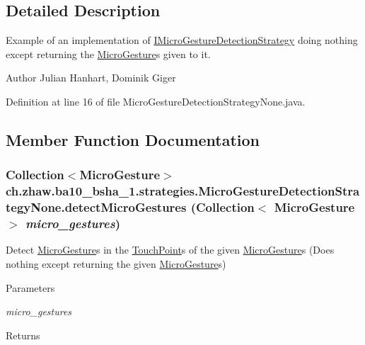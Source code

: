 \subsection{Detailed Description}
Example of an implementation of \hyperlink{interfacech_1_1zhaw_1_1ba10__bsha__1_1_1strategies_1_1IMicroGestureDetectionStrategy}{IMicroGestureDetectionStrategy} doing nothing except returning the \hyperlink{}{MicroGesture}s given to it.

\begin{DoxyAuthor}{Author}
Julian Hanhart, Dominik Giger 
\end{DoxyAuthor}


Definition at line 16 of file MicroGestureDetectionStrategyNone.java.

\subsection{Member Function Documentation}
\hypertarget{classch_1_1zhaw_1_1ba10__bsha__1_1_1strategies_1_1MicroGestureDetectionStrategyNone_affb5fbb496f04e53720496e1cc3feb88}{
\subsubsection[{detectMicroGestures}]{\setlength{\rightskip}{0pt plus 5cm}Collection$<${\bf MicroGesture}$>$ ch.zhaw.ba10\_\-bsha\_\-1.strategies.MicroGestureDetectionStrategyNone.detectMicroGestures (Collection$<$ {\bf MicroGesture} $>$ {\em micro\_\-gestures})}}
\label{classch_1_1zhaw_1_1ba10__bsha__1_1_1strategies_1_1MicroGestureDetectionStrategyNone_affb5fbb496f04e53720496e1cc3feb88}
Detect \hyperlink{}{MicroGesture}s in the \hyperlink{classch_1_1zhaw_1_1ba10__bsha__1_1_1TouchPoint}{TouchPoint}s of the given \hyperlink{}{MicroGesture}s (Does nothing except returning the given \hyperlink{}{MicroGesture}s)


\begin{DoxyParams}{Parameters}
\item[{\em micro\_\-gestures}]\end{DoxyParams}
\begin{DoxyReturn}{Returns}

\end{DoxyReturn}



